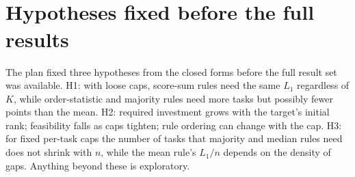 \documentclass{article}
\begin{document}
\begin{table}[h]
\caption{Sensitivity of the primary result (cap \texttt{emp99} on OLLB, \texttt{emp99T} on HELM unless stated). $n$: targets (weight draws for random weights), censored: targets the solver could not decide, feas.\ share with the baseline share in parentheses, median $K$ and $L_1$ among feasible targets, ratio of $L_1$ to the baseline over targets feasible in both (number in parentheses). Generated by \texttt{figures/src/tables.py} from \texttt{results/summary/summary\_variants.csv}.}
\label{tab:T5}
\centering\scriptsize
\resizebox{\linewidth}{!}{}\\[4pt]
\resizebox{\linewidth}{!}{}
\end{table}
\begin{table}[h]
\caption{Median ratio of $L_1$ of each rule to that of the mean, over targets feasible under both, with 95\% bootstrap interval and (targets feasible under both)/(targets feasible under either). OLLB (\texttt{emp99}, top), HELM (\texttt{emp99T}, bottom); rank strata under the mean; $^\dagger$ Borda and Condorcet on OLLB cover the 50 best targets only. The selection of jointly feasible targets is not random, so read each ratio with its counts. Generated by \texttt{figures/src/tables.py} from \texttt{results/summary/paired\_*.csv}.}
\label{tab:T6}
\centering\scriptsize
\resizebox{\linewidth}{!}{}\\[4pt]
\resizebox{\linewidth}{!}{}
\end{table}

\section{Hypotheses fixed before the full results}
\label{app:hyp}
The plan fixed three hypotheses from the closed forms before the full result set was available. H1: with loose caps, score-sum rules need the same $L_1$ regardless of $K$, while order-statistic and majority rules need more tasks but possibly fewer points than the mean. H2: required investment grows with the target's initial rank; feasibility falls as caps tighten; rule ordering can change with the cap. H3: for fixed per-task caps the number of tasks that majority and median rules need does not shrink with $n$, while the mean rule's $L_1/n$ depends on the density of gaps. Anything beyond these is exploratory.


\clearpage

\end{document}
